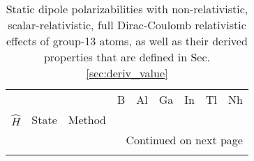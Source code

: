 \begin{longtable}{lllllllll}
\caption{Static dipole polarizabilities with non-relativistic, scalar-relativistic, full Dirac-Coulomb relativistic effects of group-13 atoms, as well as their derived properties that are defined in Sec. \ref{sec:deriv_value}}\label{tab:dipole_group_13}\\
\toprule
      &       &                                       &           B &            Al &          Ga &        In &          Tl &          Nh \\
$\hat{H}$ & State & Method &             &               &             &           &             &             \\
\midrule
\endhead
\midrule
\multicolumn{9}{r}{{Continued on next page}} \\
\midrule
\endfoot


\end{longtable}
